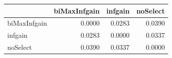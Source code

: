 \begin{tabular}{lrrr}
\toprule
 & biMaxInfgain & infgain & noSelect \\
\midrule
biMaxInfgain & 0.0000 & 0.0283 & 0.0390 \\
infgain & 0.0283 & 0.0000 & 0.0337 \\
noSelect & 0.0390 & 0.0337 & 0.0000 \\
\bottomrule
\end{tabular}
